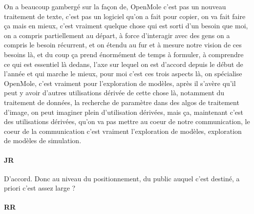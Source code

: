 \documentclass[12pt]{article}
\begin{document}
On a beaucoup gambergé sur la façon de, OpenMole c'est pas un nouveau traitement de texte, c'est pas un logiciel qu'on a fait pour copier, on va fait faire ça mais en mieux, c'est vraiment quelque chose qui est sorti d'un besoin que moi, on a compris partiellement au départ, à force d'interagir avec des gens on a compris le besoin récurrent, et on étendu au fur et à mesure notre vision de ces besoins là, et du coup ça prend énormément de temps à formuler, à comprendre ce qui est essentiel là dedans, l'axe sur lequel on est d'accord depuis le début de l'année et qui marche le mieux, pour moi c'est ces trois aspects là, on spécialise OpenMole, c'est vraiment pour l'exploration de modèles, après il s'avère qu'il peut y avoir d'autres utilisations dérivée de cette chose là, notamment du traitement de données, la recherche de paramètre dans des algos de traitement d'image, on peut imaginer plein d'utilisation dérivées, mais ça, maintenant c'est des utilisations dérivées, qu'on va pas mettre au coeur de notre communication, le coeur de la communication c'est vraiment l'exploration de modèles, exploration de modèles de simulation.

\paragraph{JR}

D'accord. Donc au niveau du positionnement, du public auquel c'est destiné, a priori c'est assez large ?

\paragraph{RR}
\end{document}
